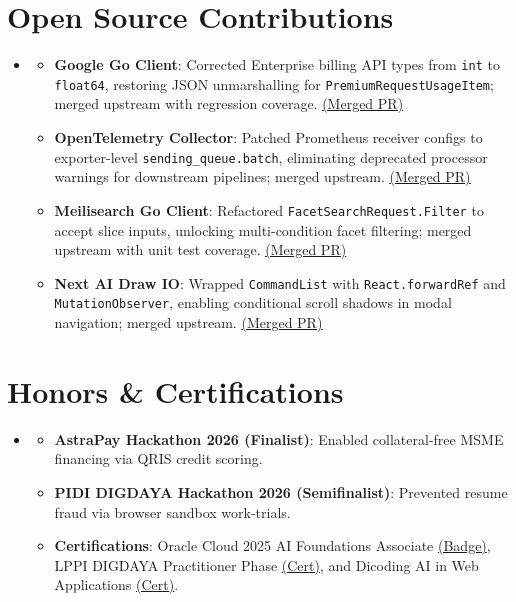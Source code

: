 \documentclass[letterpaper,11pt]{article}
\newcommand{\resumeItem}[1]{
  \item\small{
    {#1 \vspace{-1.5pt}}
  }
}
\newcommand{\resumeSubHeadingListStart}{\begin{itemize}[leftmargin=0.15in, label={}, itemsep=0pt]}
\newcommand{\resumeSubHeadingListEnd}{\end{itemize}\vspace{-8pt}}
\newcommand{\resumeItemListStart}{\begin{itemize}[noitemsep, topsep=0pt]}
\newcommand{\resumeItemListEnd}{\end{itemize}\vspace{-4pt}}
\begin{document}
\section{Open Source Contributions}
  \resumeSubHeadingListStart
    \vspace{-2pt}\item
      \resumeItemListStart
        \resumeItem{\textbf{Google Go Client}: Corrected Enterprise billing API types from \texttt{int} to \texttt{float64}, restoring JSON unmarshalling for \texttt{PremiumRequestUsageItem}; merged upstream with regression coverage. \href{https://github.com/google/go-github/pull/4002}{\underline{(Merged PR)}}}
        \resumeItem{\textbf{OpenTelemetry Collector}: Patched Prometheus receiver configs to exporter-level \texttt{sending\_queue.batch}, eliminating deprecated processor warnings for downstream pipelines; merged upstream. \href{https://github.com/open-telemetry/opentelemetry-collector-contrib/pull/45819}{\underline{(Merged PR)}}}
        \resumeItem{\textbf{Meilisearch Go Client}: Refactored \texttt{FacetSearchRequest.Filter} to accept slice inputs, unlocking multi-condition facet filtering; merged upstream with unit test coverage. \href{https://github.com/meilisearch/meilisearch-go/pull/753}{\underline{(Merged PR)}}}
        \resumeItem{\textbf{Next AI Draw IO}: Wrapped \texttt{CommandList} with \texttt{React.forwardRef} and \texttt{MutationObserver}, enabling conditional scroll shadows in modal navigation; merged upstream. \href{https://github.com/DayuanJiang/next-ai-draw-io/pull/681}{\underline{(Merged PR)}}}
      \resumeItemListEnd
  \resumeSubHeadingListEnd

\section{Honors \& Certifications}
  \resumeSubHeadingListStart
    \vspace{-2pt}\item
      \resumeItemListStart
        \resumeItem{\textbf{AstraPay Hackathon 2026 (Finalist)}: Enabled collateral-free MSME financing via QRIS credit scoring.}
        \resumeItem{\textbf{PIDI DIGDAYA Hackathon 2026 (Semifinalist)}: Prevented resume fraud via browser sandbox work-trials.}
        \resumeItem{\textbf{Certifications}: Oracle Cloud 2025 AI Foundations Associate \href{https://catalog-education.oracle.com/ords/certview/sharebadge_m?id=D4510B21F99D88A292FA173EA64DC122B01639350FCE422119EE1C499D08318E}{\underline{(Badge)}}, LPPI DIGDAYA Practitioner Phase \href{https://credsverse.com/credentials/3af61067-61ae-455c-9489-5503da02bb53}{\underline{(Cert)}}, and Dicoding AI in Web Applications \href{https://www.dicoding.com/certificates/1OP8R9058ZQK}{\underline{(Cert)}}.}
      \resumeItemListEnd
  \resumeSubHeadingListEnd
\end{document}
